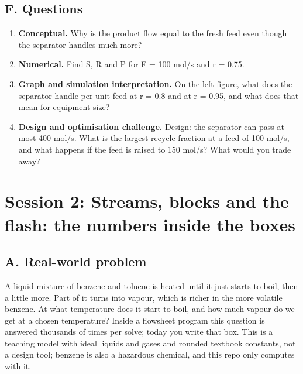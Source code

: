 \documentclass[11pt,a4paper]{article}
\begin{document}
\subsection*{F. Questions}
\begin{enumerate}[nosep]
\item \textbf{Conceptual.} Why is the product flow equal to the fresh feed even though the separator handles much more?
\item \textbf{Numerical.} Find S, R and P for F = 100 mol/s and r = 0.75.
\item \textbf{Graph and simulation interpretation.} On the left figure, what does the separator handle per unit feed at r = 0.8 and at r = 0.95, and what does that mean for equipment size?
\item \textbf{Design and optimisation challenge.} Design: the separator can pass at most 400 mol/s. What is the largest recycle fraction at a feed of 100 mol/s, and what happens if the feed is raised to 150 mol/s? What would you trade away?
\end{enumerate}

\section{Session 2: Streams, blocks and the flash: the numbers inside the boxes}

\subsection*{A. Real-world problem}
A liquid mixture of benzene and toluene is heated until it just starts to boil, then a little more. Part of it turns into vapour, which is richer in the more volatile benzene. At what temperature does it start to boil, and how much vapour do we get at a chosen temperature? Inside a flowsheet program this question is answered thousands of times per solve; today you write that box. This is a teaching model with ideal liquids and gases and rounded textbook constants, not a design tool; benzene is also a hazardous chemical, and this repo only computes with it.
\end{document}
